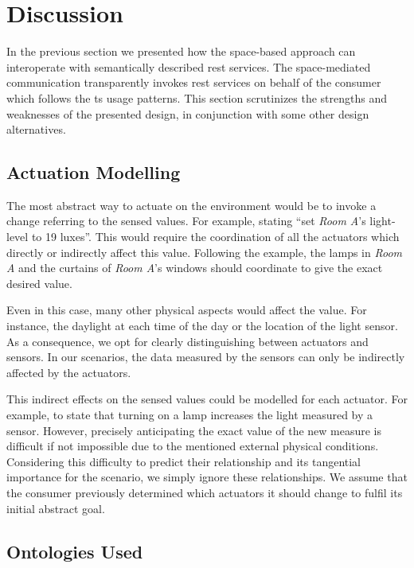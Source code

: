 \section{Discussion}
\label{sec:actuation_discussion}


In the previous section we presented how the space-based approach can interoperate with semantically described \ac{rest} services.
The space-mediated communication transparently invokes \ac{rest} services on behalf of the consumer which follows the \ac{ts} usage patterns.
This section scrutinizes the strengths and weaknesses of the presented design, in conjunction with some other design alternatives. %


\subsection{Actuation Modelling}

The most abstract way to actuate on the environment would be to invoke a change referring to the sensed values.
For example, stating ``set \emph{Room A}'s light-level to 19 luxes''.
This would require the coordination of all the actuators which directly or indirectly affect this value.
Following the example, the lamps in \emph{Room A} and the curtains of \emph{Room A}'s windows should coordinate to give the exact desired value.


Even in this case, many other physical aspects would affect the value.
For instance, the daylight at each time of the day or the location of the light sensor.
As a consequence, we opt for clearly distinguishing between actuators and sensors.
In our scenarios, the data measured by the sensors can only be indirectly affected by the actuators.


This indirect effects on the sensed values could be modelled for each actuator.
For example, to state that turning on a lamp increases the light measured by a sensor.
However, precisely anticipating the exact value of the new measure is difficult if not impossible due to the mentioned external physical conditions.
Considering this difficulty to predict their relationship and its tangential importance for the scenario, we simply ignore these relationships.
We assume that the consumer previously determined which actuators it should change to fulfil its initial abstract goal.


\subsection{Ontologies Used}


